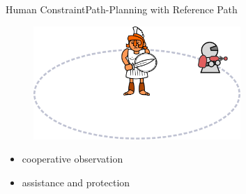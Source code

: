 \begin{frame}{Human Constraint}{Path-Planning with Reference Path}

\begin{figure}
\centering
\includegraphics[width = 0.7\textwidth]{./figure/human_robot_interaction}
\end{figure}

\begin{itemize}
\item cooperative observation
\item assistance and protection
\end{itemize}

\end{frame}


